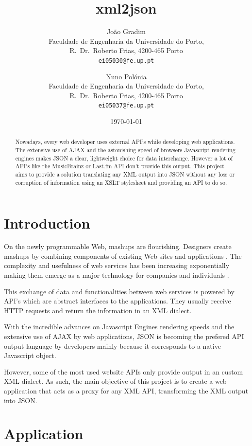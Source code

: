 \documentclass[twocolumn,twoside,10pt,a4paper]{article}
\title{xml2json}
\author{João Gradim\\
\small Faculdade de Engenharia da Universidade do Porto,\\[-0.8ex]
\small R.\ Dr.\ Roberto Frias, 4200-465 Porto\\[-0.8ex]
\small \texttt{ei05030@fe.up.pt}\\
\and
Nuno Polónia\\
\small Faculdade de Engenharia da Universidade do Porto,\\[-0.8ex]
\small R.\ Dr.\ Roberto Frias, 4200-465 Porto\\[-0.8ex]
\small \texttt{ei05037@fe.up.pt}
}
\date{\today}
\begin{document}
\maketitle
\thispagestyle{plain}

\begin{abstract}
Nowadays, every web developer uses external API's while developing web applications. The extensive use of AJAX and the astonishing speed of browsers Javascript rendering engines makes JSON a clear, lightweight choice for data interchange. However a lot of API's like the MusicBrainz or Last.fm API don't provide this output. This project aims to provide a solution translating any XML output into JSON without any loss or corruption of information using an XSLT stylesheet and providing an API to do so.
\end{abstract}

\section{Introduction}\label{sec:intro}
On the newly programmable Web, mashups are flourishing. Designers create mashups by combining components of existing Web sites and applications \cite{maximilien}. The complexity and usefulness of web services has been increasing exponentially making them emerge as a major technology for companies and individuals \cite{benslimane}.

This exchange of data and functionalities between web services is powered by API's which are abstract interfaces to the applications. They usually receive HTTP requests and return the information in an XML dialect.

With the incredible advances on Javascript Engines rendering speeds and the extensive use of AJAX by web applications, JSON is becoming the prefered API output language by developers mainly because it corresponds to a native Javascript object.

However, some of the most used website APIs only provide output in an custom XML dialect. As such, the main objective of this project is to create a web application that acts as a proxy for any XML API, transforming the XML output into JSON.

\section{Application}\label{sec:application}

\end{document}

